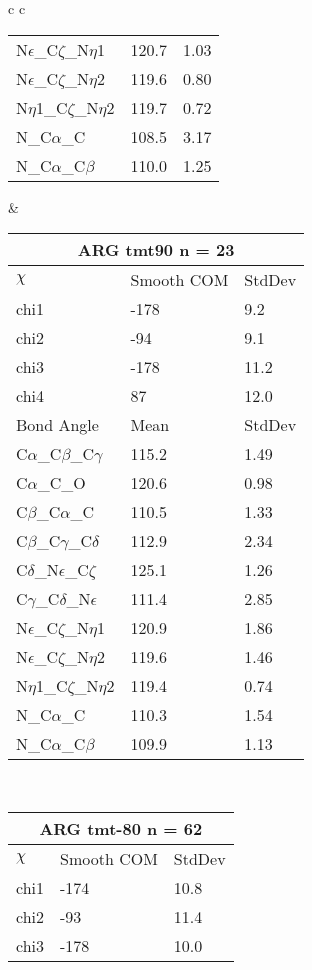 \begin{longtable}{ c c }
\begin{tabular}{ l l l }
  N$\epsilon$\_C$\zeta$\_N$\eta$1 & 120.7 & 1.03\\
  N$\epsilon$\_C$\zeta$\_N$\eta$2 & 119.6 & 0.80\\
  N$\eta$1\_C$\zeta$\_N$\eta$2 & 119.7 & 0.72\\
  N\_C$\alpha$\_C & 108.5 & 3.17\\
  N\_C$\alpha$\_C$\beta$ & 110.0 & 1.25\\
  \bottomrule
  \end{tabular}
  &
  \begin{tabular}{ l l l }
  \toprule
  \multicolumn{3}{c}{ARG \textbf{tmt90} n = 23} \\ \toprule
  $\chi$       & Smooth COM & StdDev \\ \midrule
  chi1 & -178 & 9.2 \\ 
  chi2 & -94 & 9.1 \\ 
  chi3 & -178 & 11.2 \\ 
  chi4 & 87 & 12.0 \\ \midrule
  Bond Angle   & Mean     & StdDev \\ \midrule
  C$\alpha$\_C$\beta$\_C$\gamma$ & 115.2 & 1.49\\
  C$\alpha$\_C\_O & 120.6 & 0.98\\
  C$\beta$\_C$\alpha$\_C & 110.5 & 1.33\\
  C$\beta$\_C$\gamma$\_C$\delta$ & 112.9 & 2.34\\
  C$\delta$\_N$\epsilon$\_C$\zeta$ & 125.1 & 1.26\\
  C$\gamma$\_C$\delta$\_N$\epsilon$ & 111.4 & 2.85\\
  N$\epsilon$\_C$\zeta$\_N$\eta$1 & 120.9 & 1.86\\
  N$\epsilon$\_C$\zeta$\_N$\eta$2 & 119.6 & 1.46\\
  N$\eta$1\_C$\zeta$\_N$\eta$2 & 119.4 & 0.74\\
  N\_C$\alpha$\_C & 110.3 & 1.54\\
  N\_C$\alpha$\_C$\beta$ & 109.9 & 1.13\\
  \bottomrule
  \end{tabular}
  \\
  \begin{tabular}{ l l l }
  \toprule
  \multicolumn{3}{c}{ARG \textbf{tmt-80} n = 62} \\ \toprule
  $\chi$       & Smooth COM & StdDev \\ \midrule
  chi1 & -174 & 10.8 \\ 
  chi2 & -93 & 11.4 \\ 
  chi3 & -178 & 10.0 \\ 

\end{tabular}
\end{longtable}
